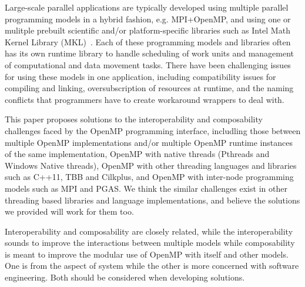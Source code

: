 Large-scale parallel applications are typically developed using multiple parallel programming models in 
a hybrid fashion, e.g. MPI+OpenMP, and using one or mulitple prebuilt scientific and/or platform-specific libraries such as Intel Math Kernel Library (MKL)~\cite{wang2014intel}.
Each of these programming models and libraries often has its own runtime library to handle scheduling of work units and management of computational
and data movement tasks. 
There have been challenging issues for using these models in one application, including 
compatibility issues for compiling and linking, oversubscription of resources at runtime, and the naming conflicts that 
programmers have to create workaround wrappers to deal with.

This paper proposes solutions to the interoperability and composability challenges faced by the OpenMP programming interface, includling those
between multiple OpenMP implementations and/or multiple OpenMP runtime instances of the same implementation, OpenMP 
with native threads (Pthreads and Windows Native threads), OpenMP with other threading languages and libraries such 
as C++11, TBB and Cilkplus, and OpenMP with inter-node programming models such as MPI and PGAS. We 
think the similar challenges exist in other threading based libraries and language implementations, and believe
the solutions we provided  will work for them too.  

Interoperability and composability are closely related, while the interoperability sounds to improve the interactions between multiple models
while composability is meant to improve the modular use of OpenMP with itself and other models. One is from the aspect of system while 
the other is more concerned with software engineering. Both should be considered when developing solutions. 

